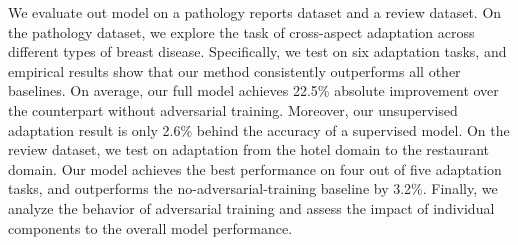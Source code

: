 We evaluate out model on a pathology reports dataset and a review dataset. On the pathology dataset, we explore the task of cross-aspect adaptation across different types of breast disease. Specifically, we test on six adaptation tasks, and empirical results show that our method consistently outperforms all other baselines. On average, our full model achieves 22.5\% absolute improvement over the counterpart without adversarial training. Moreover, our unsupervised adaptation result is only 2.6\% behind the accuracy of a supervised model. On the review dataset, we test on adaptation from the hotel domain to the restaurant domain. Our model achieves the best performance on four out of five adaptation tasks, and outperforms the no-adversarial-training baseline by 3.2\%. Finally, we analyze the behavior of adversarial training and assess the impact of individual components to the overall model performance.